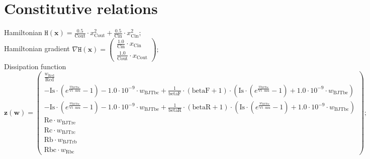 \documentclass[11pt, oneside]{article}      %
\begin{document}
\section{Constitutive relations}
%
Hamiltonian $ \mathtt{H}(\mathbf{x}) = \frac{0.5}{\mathrm{Cout}} \cdot x_{\mathrm{Cout}}^{2} + \frac{0.5}{\mathrm{Cin}} \cdot x_{\mathrm{Cin}}^{2} ; $ 
%
\\
%
Hamiltonian gradient $ \nabla \mathtt{H}(\mathbf{x}) = \left(\begin{array}{c}\frac{1.0}{\mathrm{Cin}} \cdot x_{\mathrm{Cin}}\\\frac{1.0}{\mathrm{Cout}} \cdot x_{\mathrm{Cout}}\end{array}\right) ; $ 
%
\\
%
Dissipation function $ \mathbf{z}(\mathbf{w}) = \left(\begin{array}{c}\frac{w_{\mathrm{Rcd}}}{\mathrm{Rcd}}\\- \mathrm{Is} \cdot \left(e^{\frac{w_{\mathrm{BJTbc}}}{\mathrm{Vt} \cdot \mathrm{mu}}} - 1\right) - 1.0 \cdot 10^{-9} \cdot w_{\mathrm{BJTbc}} + \frac{1}{\mathrm{betaF}} \cdot \left(\mathrm{betaF} + 1\right) \cdot \left(\mathrm{Is} \cdot \left(e^{\frac{w_{\mathrm{BJTbe}}}{\mathrm{Vt} \cdot \mathrm{mu}}} - 1\right) + 1.0 \cdot 10^{-9} \cdot w_{\mathrm{BJTbe}}\right)\\- \mathrm{Is} \cdot \left(e^{\frac{w_{\mathrm{BJTbe}}}{\mathrm{Vt} \cdot \mathrm{mu}}} - 1\right) - 1.0 \cdot 10^{-9} \cdot w_{\mathrm{BJTbe}} + \frac{1}{\mathrm{betaR}} \cdot \left(\mathrm{betaR} + 1\right) \cdot \left(\mathrm{Is} \cdot \left(e^{\frac{w_{\mathrm{BJTbc}}}{\mathrm{Vt} \cdot \mathrm{mu}}} - 1\right) + 1.0 \cdot 10^{-9} \cdot w_{\mathrm{BJTbc}}\right)\\\mathrm{Re} \cdot w_{\mathrm{BJTre}}\\\mathrm{Rc} \cdot w_{\mathrm{BJTrc}}\\\mathrm{Rb} \cdot w_{\mathrm{BJTrb}}\\\mathrm{Rbc} \cdot w_{\mathrm{Rbc}}\end{array}\right) ; $ 
%
\\
%
\end{document}
